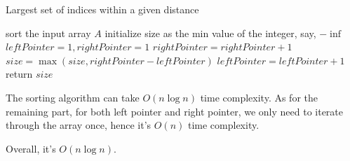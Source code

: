 
\begin{algorithm}
  \caption{Largest set of indices within a given distance}
  sort the input array $A$\;
  initialize size as the min value of the integer, say, $-\inf$\;
  $leftPointer = 1, rightPointer = 1$\;
  {
    {
    	$rightPointer = rightPointer + 1$\;
    }
    $size = \max(size, rightPointer-leftPointer)$\;
    $leftPointer = leftPointer +1$\;
}
    return $size$\;
\end{algorithm}



The sorting algorithm can take $O(n\log n)$ time complexity. As for the remaining part, for both left pointer and right pointer, we only need to iterate through the array once, hence it's $O(n)$ time complexity.

Overall, it's $O(n\log n)$.



